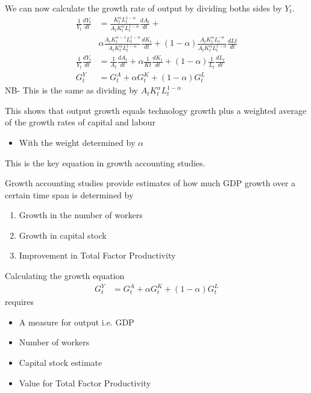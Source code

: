 \documentclass{beamer}
\begin{document}
\begin{frame}
  We can now calculate the growth rate of output by dividing boths sides by $Y_t$.   
  \begin{align}
    \frac{1}{Y_t}\frac{dY_t}{dt} & = \frac{K_t^{\alpha}L_t^{1-\alpha}}{A_tK_t^{\alpha}L_t^{1-\alpha}} \frac{dA_t}{dt} + \\& \alpha \frac{A_tK_t^{\alpha-1}L_1^{1-\alpha}}{A_tK_t^{\alpha}L_t^{1-\alpha}} \frac{dK_t}{dt} + (1-\alpha) \frac{A_tK_t^{\alpha}L_t^{-\alpha}}{A_tK_t^{\alpha}L_t^{1-\alpha}} \frac{dLt}{dt}\\
    \frac{1}{Y_t}\frac{dY_t}{dt} & = \frac{1}{A_t}\frac{dA_t}{dt} + \alpha \frac{1}{Kt}\frac{dK_t}{dt} + (1-\alpha) \frac{1}{L_t}\frac{dL_t}{dt}\\ 
    G_t ^Y &=G_t^A +\alpha G_t^K + (1-\alpha)G_t^L
\end{align}
  \medskip
  NB- This is the same as dividing by $A_tK_t^{\alpha}L_t^{1-\alpha}$
\end{frame}

\begin{frame}
  This shows that output growth equals technology growth plus a weighted average of the growth rates of capital and labour
  \begin{itemize}
    \item With the weight determined by $\alpha$
  \end{itemize}
  \medskip
  This is the key equation in growth accounting studies. 
\end{frame}

\begin{frame}
  Growth accounting studies provide estimates of how much GDP growth over a certain time span is determined by 
  \begin{enumerate}
    \item Growth in the number of workers
    \item Growth in capital stock
    \item Improvement in Total Factor Productivity
  \end{enumerate}
\end{frame}

\begin{frame}
Calculating the growth equation
\begin{align}
  G_t ^Y &=G_t^A +\alpha G_t^K + (1-\alpha)G_t^L
\end{align}
\medskip
requires
\begin{itemize}
  \item A measure for output i.e. GDP
  \item Number of workers
  \item Capital stock estimate 
  \item Value for Total Factor Productivity
\end{itemize}
\end{frame}
\end{document}
